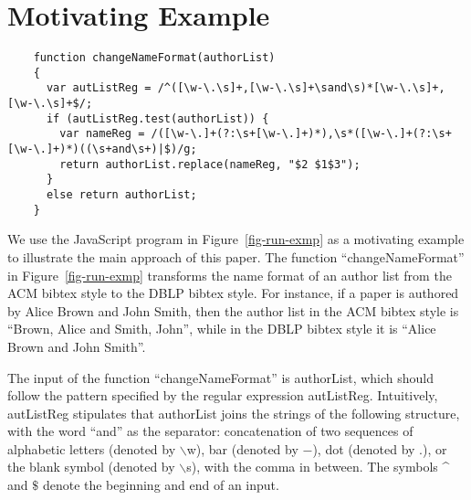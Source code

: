 
\section{Motivating Example}\label{sec:mot}

\begin{figure*}[htbp]
\begin{center}
{
\begin{verbatim}
    function changeNameFormat(authorList)
    {
      var autListReg = /^([\w-\.\s]+,[\w-\.\s]+\sand\s)*[\w-\.\s]+,[\w-\.\s]+$/;
      if (autListReg.test(authorList)) {
        var nameReg = /([\w-\.]+(?:\s+[\w-\.]+)*),\s*([\w-\.]+(?:\s+[\w-\.]+)*)((\s+and\s+)|$)/g;
        return authorList.replace(nameReg, "$2 $1$3");
      }
      else return authorList;
    }
\end{verbatim}
}
\end{center}
\caption{Change the name format of an author list: A motivating example}
\label{fig-run-exmp}
\end{figure*}


We use the JavaScript program in Figure~\ref{fig-run-exmp} as a motivating example to illustrate the main approach of this paper. 
The function ``changeNameFormat''  in Figure~\ref{fig-run-exmp} transforms the name format of an author list from the ACM bibtex style to the DBLP bibtex style. For instance,  if a paper is authored by Alice Brown and John Smith, then the author list in the ACM bibtex style is ``Brown, Alice and Smith, John'', while  in the DBLP bibtex style it is ``Alice Brown and John Smith''. 


The input of the function ``changeNameFormat'' is {\sf authorList}, which should follow the pattern specified by the regular expression {\sf autListReg}. Intuitively, {\sf autListReg} stipulates that {\sf authorList} %
joins the strings of the following structure, with the word ``and'' as the separator: concatenation of two sequences of alphabetic letters (denoted by $\backslash$w), bar (denoted by $-$), dot (denoted by $.$), or the blank symbol (denoted by $\backslash$s), with the comma in between. The symbols \^{} and $\$$ denote the beginning and end of an input.

